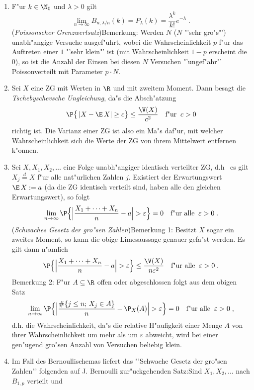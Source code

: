 \begin{enumerate}
\item
F"ur $k\in\N_0$ und $\lambda>0$ gilt
\[\lim_{n\to\infty}B_{n,\lambda/n}(k)=P_{\lambda}(k)=\frac{\lambda^k}{k!}e^{
-\lambda}\;.\] ({\it Poissonscher Grenzwertsatz})\newline Bemerkung:
Werden $N$ ($N$ "'sehr gro"s"') unabh"angige Versuche ausgef"uhrt,
wobei die Wahrscheinlichkeit $p$ f"ur das Auftreten einer $1$ "'sehr
klein"' ist (mit Wahrscheinlichkeit $1-p$ erscheint die $0$), so ist
die Anzahl der Einsen bei diesen $N$ Versuchen "'ungef"ahr"'
Poissonverteilt mit Parameter $p\cdot N$.\newline
\item
Sei $X$ eine ZG mit Werten in $\R$ und mit zweitem Moment. Dann
besagt die {\it Tschebyschevsche Ungleichung}, da"s die Absch"atzung
\[\P\big\{\,|X-\E\,X|\ge c\big\}\le\frac{\V(X)}{c^2}\quad
\mbox{f"ur}\;\;c>0\] richtig ist. Die Varianz einer ZG ist also ein
Ma"s daf"ur, mit welcher Wahrscheinlichkeit sich die Werte der ZG
von ihrem Mittelwert entfernen k"onnen.
\item
Sei $X,X_1,X_2,\ldots$ eine Folge unabh"angiger identisch verteilter ZG, d.h~%
es gilt $X_j\stackrel{d}{=}X$ f"ur alle nat"urlichen Zahlen $j$.
Existiert der Erwartungswert $\E\,X:=a$ (da die ZG identisch
verteilt sind, haben alle den gleichen Erwartungswert), so folgt
\[\lim_{n\to\infty}\P\Big\{\Big|\frac{X_1+\cdots+X_n}{n}-a
\Big|>\varepsilon\Big\}=0\quad\mbox{f"ur alle}\;\;\varepsilon>0\;.\]
({\it Schwaches Gesetz der gro"sen Zahlen})\newline Bemerkung 1:
Besitzt $X$ sogar ein zweites Moment, so kann die obige Limesaussage
genauer gefa"st werden. Es gilt dann n"amlich
\[\P\Big\{\Big|\frac{X_1+\cdots+X_n}{n}-a
\Big|>\varepsilon\Big\}\le\frac{\V(X)}{n\varepsilon^2}\quad
\mbox{f"ur alle}\;\;\varepsilon>0\;.\] Bemerkung 2: F"ur
$A\subseteq\R$ offen oder abgeschlossen folgt aus dem obigen Satz
\[\lim_{n\to\infty}\P\Big\{\Big|\frac{\#\{j\le n;\,X_j\in A\}}
{n}-\P_{X}(A)\Big|>\varepsilon\Big\}=0\quad\mbox{f"ur alle}\;\;
\varepsilon>0\;,\] d.h. die Wahrscheinlichkeit, da"s die relative
H"aufigkeit einer Menge $A$ von ihrer Wahrscheinlichkeit um mehr als
um $\varepsilon$ abweicht, wird bei einer gen"ugend gro"sen Anzahl
von Versuchen beliebig klein.
\item
Im Fall des Bernoullischemas liefert das "'Schwache Gesetz der
gro"sen Zahlen"' folgenden auf J. Bernoulli zur"uckgehenden
Satz:\newline Sind $X_1,X_2,\ldots$ nach $B_{1,p}$ verteilt und

\end{enumerate}
